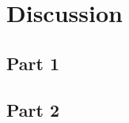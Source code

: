 \chapter{Discussion}
\label{ChapterDiscussion}

\section{Part 1}

\lipsum[10]

\section{Part 2}

\lipsum[2]